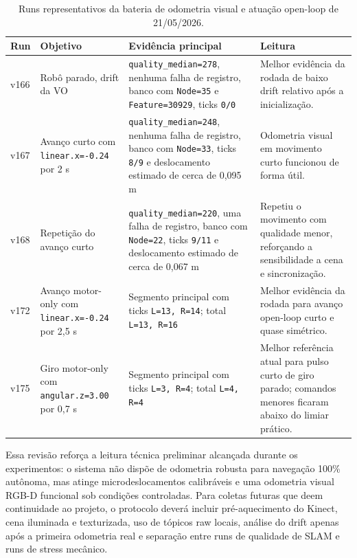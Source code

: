 \begin{table}[H]
\centering
\caption{Runs representativos da bateria de odometria visual e atuação open-loop de 21/05/2026.}
\label{tab:vo-openloop-20260521}
\begin{tabularx}{\textwidth}{p{1.4cm} p{3.3cm} p{4.3cm} X}
\hline
\textbf{Run} & \textbf{Objetivo} & \textbf{Evidência principal} & \textbf{Leitura} \\
\hline
v166 & Robô parado, drift da VO & \texttt{quality\_median=278}, nenhuma falha de registro, banco com \texttt{Node=35} e \texttt{Feature=30929}, ticks \texttt{0/0} & Melhor evidência da rodada de baixo drift relativo após a inicialização. \\
v167 & Avanço curto com \texttt{linear.x=-0.24} por 2 s & \texttt{quality\_median=248}, nenhuma falha de registro, banco com \texttt{Node=33}, ticks \texttt{8/9} e deslocamento estimado de cerca de 0,095 m & Odometria visual em movimento curto funcionou de forma útil. \\
v168 & Repetição do avanço curto & \texttt{quality\_median=220}, uma falha de registro, banco com \texttt{Node=22}, ticks \texttt{9/11} e deslocamento estimado de cerca de 0,067 m & Repetiu o movimento com qualidade menor, reforçando a sensibilidade a cena e sincronização. \\
v172 & Avanço motor-only com \texttt{linear.x=-0.24} por 2,5 s & Segmento principal com ticks \texttt{L=13, R=14}; total \texttt{L=13, R=16} & Melhor evidência da rodada para avanço open-loop curto e quase simétrico. \\
v175 & Giro motor-only com \texttt{angular.z=3.00} por 0,7 s & Segmento principal com ticks \texttt{L=3, R=4}; total \texttt{L=4, R=4} & Melhor referência atual para pulso curto de giro parado; comandos menores ficaram abaixo do limiar prático. \\
\hline
\end{tabularx}
\end{table}

Essa revisão reforça a leitura técnica preliminar alcançada durante os experimentos: o sistema não dispõe de odometria robusta para navegação 100\% autônoma, mas atinge microdeslocamentos calibráveis e uma odometria visual RGB-D funcional sob condições controladas. Para coletas futuras que deem continuidade ao projeto, o protocolo deverá incluir pré-aquecimento do Kinect, cena iluminada e texturizada, uso de tópicos raw locais, análise do drift apenas após a primeira odometria real e separação entre runs de qualidade de SLAM e runs de stress mecânico.

